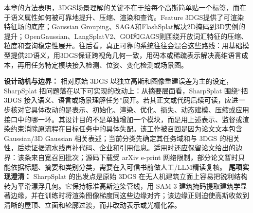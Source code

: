 本章的方法表明，3DGS场景理解的关键不在于给每个高斯简单贴一个标签，而在于语义属性如何被可靠地提升、压缩、渲染和查询。Feature 3DGS提供了可渲染特征场的底座；Gaussian Grouping、SAGA和FlashSplat解决2D掩码到3D实例的提升；OpenGaussian、LangSplatV2、GOI和GAGS则围绕开放词汇特征的压缩、粒度和查询稳定性展开。往后看，真正可靠的系统往往会混合这些路线：用基础模型提供2D语义，用3DGS保证跨视角几何一致，用码本或稀疏表示解决高维语言成本，再用任务特定模块接入检测、位姿、变化检测或场景图。

\textbf{设计动机与边界：} 相对原始 3DGS 以独立高斯和图像重建误差为主的设定，SharpSplat 把问题落在以下可实现的改动上：从摘要层面看，SharpSplat 围绕“把 3DGS 接入语义、语言或场景理解任务”展开。若其正文或代码后续可读，应进一步核对它具体改动的是表示、初始化、渲染、优化、损失、动态建模、压缩或应用接口中的哪一环。其设计目的不是单独增加一个模块，而是用上述表示、监督或渲染约束消除原流程在目标任务中的具体失配。该工作被召回是因为论文文本包含 Gaussian/3D Gaussian 相关表述；当前分类先确定其任务域和与 3DGS 的相关性，后续证据流水线再补代码、企业和引用信息。适用时还应保留论文给出的边界：该条来自宽召回批次；源码下载受 arXiv e-print 网络限制，部分论文暂时只能依据标题、摘要和类别分类，需要在入可信书前做人工/LLM精读复核。
\textbf{尾项实现澄清：} SharpSplat 的出发点是原始 3DGS 在无人机建筑立面上容易把锐利结构转为平滑漂浮几何。它保持标准高斯渲染管线，用 SAM 3 建筑掩码提取建筑学显著边缘，并在训练时将渲染图像梯度同这些边缘对齐；该边缘正则迫使高斯收敛到清晰的屋顶、立面和轮廓过渡，而非改动表示或光栅化器。
